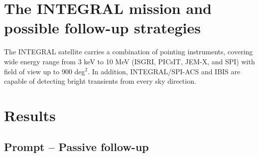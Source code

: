 \documentclass[a0,portrait]{a0poster}
\newcommand{\ECM}[1] {\textbf{\textcolor{magenta}{#1}}}
\begin{document}
\begin{multicols}{2}
\section*{The INTEGRAL mission and possible follow-up strategies}


The INTEGRAL satellite carries a combination of pointing instruments,
covering wide energy range from 3 keV to 10 MeV (ISGRI, PICsIT, JEM-X,
and SPI) with field of view up to 900 deg$^2$. In addition,
INTEGRAL/SPI-ACS and IBIS are capable of detecting bright transients
from every sky direction.


\section*{Results}

\subsection*{Prompt -- Passive follow-up}


\end{multicols}
\end{document}
